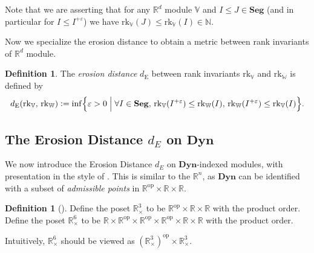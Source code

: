 \documentclass[a4paper,UKenglish,thm-restate]{article}
\theoremstyle{definition}
\newtheorem{definition}[theorem]{Definition}
\def\bdyn{\mathbf{Dyn}}
\newcommand{\defeq}{\vcentcolon=}
\begin{document}
        Note that we are asserting that for any $\mathbb{R}^d$ module $\mathbb{V}$ and $I\leq J\in\mathbf{Seg}$ (and in particular for $I\leq I^{+\varepsilon}$) we have $\mathrm{rk}_\mathbb{V}(J)\leq\mathrm{rk}_\mathbb{V}(I)\in\mathbb{N}$. 

        Now we specialize the erosion distance \cite{patelerosion} to obtain a metric between rank invariants of $\mathbb{R}^d$ module.

        \begin{definition}
            The \emph{erosion distance} $d_\text{E}$ between rank invariants  $\mathrm{rk}_\mathbb{V}$ and $\mathrm{rk}_\mathbb{W}$ is defined by
            \[
            d_\text{E}(\mathrm{rk}_\mathbb{V},\,\mathrm{rk}_\mathbb{W}) \defeq \inf\Bigl\{ \varepsilon>0\;\Bigr\rvert \; \forall I\in\operatorname{\mathbf{Seg}},\, \mathrm{rk}_\mathbb{V}(I^{+\varepsilon})\leq \mathrm{rk}_\mathbb{W}(I) ,\, \mathrm{rk}_\mathbb{W}(I^{+\varepsilon})\leq \mathrm{rk}_\mathbb{V}(I) \Bigr\}.
            \]
        \end{definition}
    \subsection{The Erosion Distance $d_E$ on $\bdyn$}
        We now introduce the Erosion Distance $d_E$ on $\bdyn$-indexed modules, with presentation in the style of \cite{spatiotemporal}. This is similar to the $\mathbb{R}^n$, as $\bdyn$ can be identified with a subset of \emph{admissible points} in $\mathbb{R}^{\mathrm{op}} \times \mathbb{R} \times \mathbb{R}$.

        \begin{definition}[\cite{spatiotemporal}]
            Define the poset $\mathbb{R}_{\times}^3$ to be $\mathbb{R}^{\mathrm{op}} \times \mathbb{R} \times \mathbb{R}$ with the product order. Define the poset $\mathbb{R}_{\times}^6$ to be $\mathbb{R} \times \mathbb{R}^{\mathrm{op}} \times \mathbb{R}^{\mathrm{op}} \times \mathbb{R}^{\mathrm{op}} \times \mathbb{R} \times \mathbb{R}$ with the product order.

            Intuitively, $\mathbb{R}_{\times}^6$ should be viewed as $\left(\mathbb{R}_{\times}^3\right)^{\mathrm{op}} \times \mathbb{R}_{\times}^3$.
        \end{definition}
\end{document}
